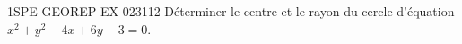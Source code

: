 \begin{exercice}{1SPE-GEOREP-EX-023}{1}{12}
Déterminer le centre et le rayon du cercle d'équation $x^2 + y^2 - 4x + 6y - 3 = 0$.
\end{exercice}
